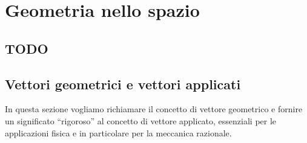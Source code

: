 
\newcommand{\bR}[1]{\mathbb{R}^{#1}}
\newcommand{\bS}[1]{\mathbb{S}^{#1}}
\newcommand{\bA}[1]{\mathbb{A}^{#1}} 
\newcommand{\bE}[1]{\mathbb{E}^{#1}}

\newtheorem*{NB}{\textbf{N.B}}

\newtheorem*{sol}{\textbf{Sol}}

\newtheorem{exercise}{\textbf{Esercizio}}

\newenvironment{soluz}
{\begin{sol}}{\begin{flushright}$\star$\end{flushright}\end{sol}}

\chapter{Geometria nello spazio}

\section{TODO}


% 

\section{Vettori geometrici e vettori applicati}
\label{sec:3D_vettori}

In questa sezione vogliamo richiamare il concetto di vettore geometrico e 
fornire un significato ``rigoroso'' al concetto di vettore applicato, essenziali 
per le applicazioni fisica e in particolare per la meccanica razionale. 

